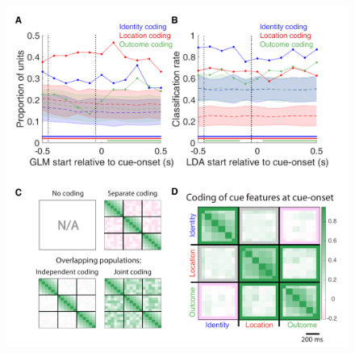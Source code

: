 \documentclass[11pt]{article}
\begin{document}
 \begin{figure}[ht!]
\centering
\includegraphics[height=0.5\textheight]{Fig 5 - Q1.pdf}

\end{figure}
\end{document}
